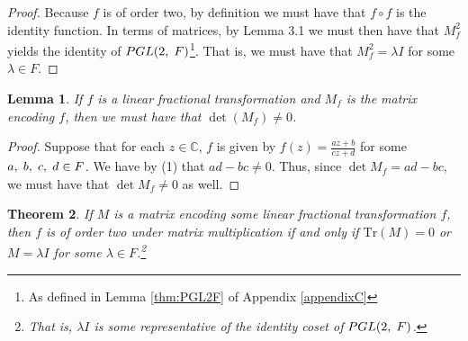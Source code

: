 \documentclass[12pt]{article}
\newcommand{\C}{\mathbb{C}}
\newcommand{\ttc}{, \hspace{1mm}}
\newcommand{\Tr}{\text{Tr}}
\theoremstyle{plain}
\newtheorem{theorem}{Theorem}[section]
\newtheorem{lemma}[theorem]{Lemma}
\theoremstyle{definition}
\begin{document}
\begin{proof}
	Because $f$ is of order two, by definition we must have that $f \circ f$ is the identity function. In terms of matrices, by Lemma 3.1 we must then have that $M_f^2$ yields the identity of $PGL(2\ttc F)$\footnote{As defined in Lemma \ref{thm:PGL2F} of Appendix \ref{appendixC}}. That is, we must have that $M_f^2 = \lambda I$ for some $\lambda \in F$.
\end{proof}

\begin{lemma}
	If $f$ is a linear fractional transformation and $M_f$ is the matrix encoding $f$, then we must have that $\det(M_f) \neq 0$.
\end{lemma}

\begin{proof}
	Suppose that for each $z \in \C$, $f$ is given by $f(z) = \frac{az+b}{cz+d}$ for some $a\ttc b\ttc c\ttc d \in F$. We have by (1) that $ad-bc \neq 0$. Thus, since $\det M_f = ad-bc$, we must have that $\det M_f \neq 0$ as well.
\end{proof}

\begin{theorem}
If $M$ is a matrix encoding some linear fractional transformation $f$, then $f$ is of order two under matrix multiplication if and only if $\Tr(M) = 0$ or $M = \lambda I$ for some $\lambda \in F$.\footnote{That is, $\lambda I$ is some representative of the identity coset of $PGL(2\ttc F)$.}
\end{theorem}
\end{document}
